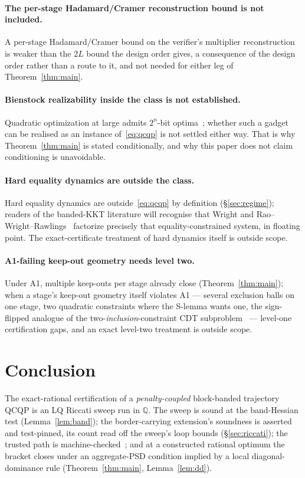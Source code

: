 \documentclass[11pt]{article}
\theoremstyle{definition}
\theoremstyle{remark}
\newcommand{\Q}{\mathbb{Q}}
\renewcommand{\_}{\ifdim\fontdimen3\font=0pt\relax\char`\_\else\textunderscore\fi\hspace{0pt}}
\begin{document}
\paragraph{The per-stage Hadamard/Cramer reconstruction bound is not
included.} A per-stage Hadamard/Cramer bound on the verifier's multiplier
reconstruction is weaker than the $2L$ bound the design order gives, a
consequence of the design order rather than a route to it, and not needed
for either leg of Theorem~\ref{thm:main}.

\paragraph{Bienstock realizability inside the class is not established.}
Quadratic optimization at large admits $2^n$-bit
optima~\cite{bienstock2020}; whether such a gadget can be realised as an
instance of~\eqref{eq:qcqp} is not settled either way. That is why
Theorem~\ref{thm:main} is stated conditionally, and why this paper does not
claim conditioning is unavoidable.

\paragraph{Hard equality dynamics are outside the class.} Hard equality
dynamics are outside~\eqref{eq:qcqp} by definition (\S\ref{sec:regime});
readers of the banded-KKT literature will recognise that Wright and
Rao--Wright--Rawlings~\cite{wright1993,rao1998} factorize precisely that
equality-constrained system, in floating point. The exact-certificate
treatment of hard dynamics itself is outside scope.

\paragraph{A1-failing keep-out geometry needs level two.} Under A1, multiple
keep-outs per stage already close (Theorem~\ref{thm:main}); when a stage's
keep-out geometry itself violates A1 --- several exclusion balls on one
stage, two quadratic constraints where the S-lemma wants one, the
sign-flipped analogue of the two-\emph{inclusion}-constraint CDT
subproblem~\cite{celis1985,aizhang2009} --- level-one certification gaps,
and an exact level-two treatment is outside scope.

\section{Conclusion}\label{sec:conclusion}
The exact-rational certification of a \emph{penalty-coupled} block-banded
trajectory QCQP is an LQ Riccati sweep run in $\Q$. The sweep is sound at the
band-Hessian test (Lemma~\ref{lem:band}); the border-carrying extension's
soundness is asserted and test-pinned, its count read off the sweep's loop
bounds (\S\ref{sec:riccati}); the trusted path is
machine-checked~\cite{leannote}; and at a constructed rational optimum the
bracket closes under an aggregate-PSD condition implied by a local
diagonal-dominance rule (Theorem~\ref{thm:main}, Lemma~\ref{lem:dd}).
\end{document}
